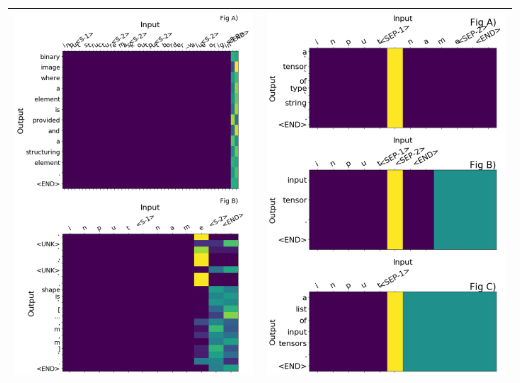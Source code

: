 \begin{table}
\begin{center}

\begin{tabular}{ | c || c |}
    \hline
    \hline
    \includegraphics[width=0.5\linewidth]{images/otherargs_example.png}
    &
    \includegraphics[width=0.5\linewidth]{images/different_translations_dupsXotherargs_3230minib.png} \\


    \hline

    \hline
\end{tabular}
\end{center}
\end{table}



